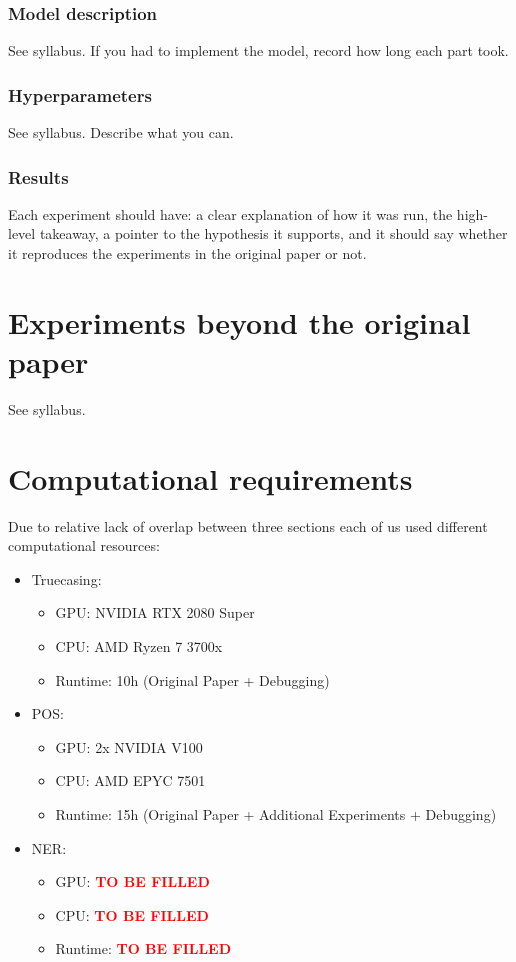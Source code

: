 \documentclass[11pt,a4paper]{article}
\begin{document}
    \subsubsection{Model description}
    See syllabus. If you had to implement the model, record how long each part took.

    \subsubsection{Hyperparameters}
    See syllabus. Describe what you can.

    \subsubsection{Results}
    Each experiment should have: a clear explanation of how it was run, the high-level takeaway, a pointer to the hypothesis it supports, and it should say whether it reproduces the experiments in the original paper or not.

\section{Experiments beyond the original paper}
See syllabus.

\section{Computational requirements}
Due to relative lack of overlap between three sections each of us used different computational resources:
\begin{itemize}
    \item Truecasing:
    \begin{itemize}
        \item GPU: NVIDIA RTX 2080 Super
        \item CPU: AMD Ryzen 7 3700x
        \item Runtime: 10h (Original Paper + Debugging)
    \end{itemize}
    \item POS:
    \begin{itemize}
        \item GPU: 2x NVIDIA V100
        \item CPU: AMD EPYC 7501
        \item Runtime: 15h (Original Paper + Additional Experiments + Debugging)
    \end{itemize}
    \item NER:
    \begin{itemize}
        \item GPU: \textbf{\textcolor{red}{TO BE FILLED}}
        \item CPU: \textbf{\textcolor{red}{TO BE FILLED}}
        \item Runtime: \textbf{\textcolor{red}{TO BE FILLED}}
    \end{itemize}
\end{itemize}
\end{document}

